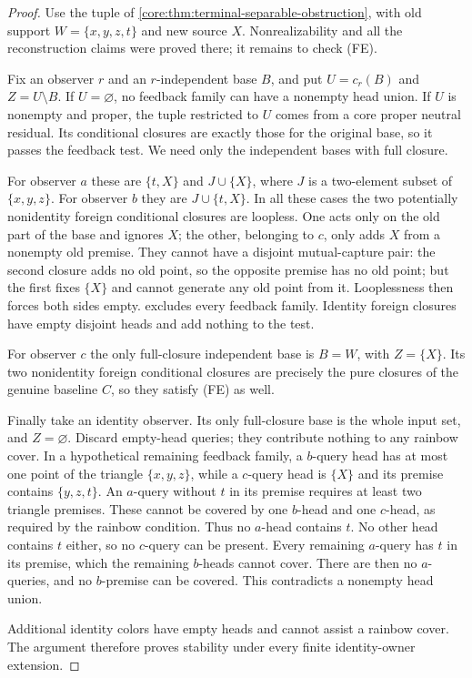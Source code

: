 \begin{proof}
Use the tuple of \cref{core:thm:terminal-separable-obstruction}, with
old support $W=\{x,y,z,t\}$ and new source $X$. Nonrealizability and
all the reconstruction claims were proved there; it remains to check (FE).

Fix an observer $r$ and an $r$-independent base $B$, and put
$U=c_r(B)$ and $Z=U\setminus B$. If $U=\varnothing$, no feedback
family can have a nonempty head union. If $U$ is nonempty and proper,
the tuple restricted to $U$ comes from a core proper
neutral residual. Its conditional closures are exactly those for the
original base, so it passes the feedback test. We need only the
independent bases with full closure.

For observer $a$ these are $\{t,X\}$ and $J\cup\{X\}$, where
$J$ is a two-element subset of $\{x,y,z\}$. For observer $b$ they
are $J\cup\{t,X\}$. In all these cases the two potentially nonidentity
foreign conditional closures are loopless. One acts only on the old
part of the base and ignores $X$; the other, belonging to $c$, only
adds $X$ from a nonempty old premise. They cannot have a disjoint
mutual-capture pair: the second closure adds no old point, so the
opposite premise has no old point; but the first fixes $\{X\}$
and cannot generate any old point from it. Looplessness then forces
both sides empty.  excludes every
feedback family. Identity foreign closures have empty disjoint heads
and add nothing to the test.

For observer $c$ the only full-closure independent base is $B=W$,
with $Z=\{X\}$. Its two nonidentity foreign conditional closures
are precisely the pure closures of the genuine baseline $C$, so they
satisfy (FE) as well.

Finally take an identity observer. Its only full-closure base is the
whole input set, and $Z=\varnothing$. Discard empty-head queries;
they contribute nothing to any rainbow cover. In a hypothetical
remaining feedback family, a $b$-query head has at most one point of the triangle
$\{x,y,z\}$, while a $c$-query head is $\{X\}$ and its premise
contains $\{y,z,t\}$. An $a$-query without $t$ in its premise
requires at least two triangle premises. These cannot be covered by
one $b$-head and one $c$-head, as required by the rainbow condition.
Thus no $a$-head contains $t$. No other head contains $t$ either,
so no $c$-query can be present. Every remaining $a$-query has $t$
in its premise, which the remaining $b$-heads cannot cover. There
are then no $a$-queries, and no $b$-premise can be covered. This
contradicts a nonempty head union.

Additional identity colors have empty heads and cannot assist a
rainbow cover. The argument therefore proves stability under every
finite identity-owner extension.
\end{proof}
